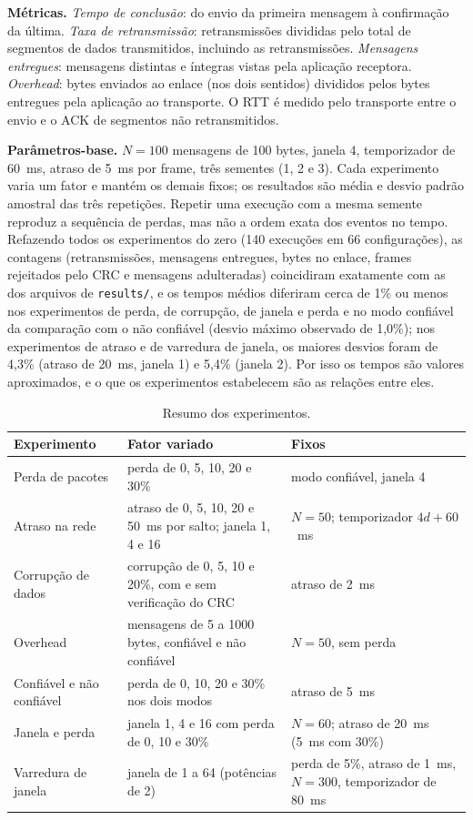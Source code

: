 \documentclass[11pt,a4paper]{article}
\begin{document}
\textbf{M\'etricas.} \emph{Tempo de conclus\~ao}: do envio da primeira mensagem \`a confirma\c{c}\~ao da \'ultima. \emph{Taxa de retransmiss\~ao}: retransmiss\~oes divididas pelo total de segmentos de dados transmitidos, incluindo as retransmiss\~oes. \emph{Mensagens entregues}: mensagens distintas e \'integras vistas pela aplica\c{c}\~ao receptora. \emph{Overhead}: bytes enviados ao enlace (nos dois sentidos) divididos pelos bytes entregues pela aplica\c{c}\~ao ao transporte. O RTT \'e medido pelo transporte entre o envio e o ACK de segmentos n\~ao retransmitidos.

\textbf{Par\^ametros-base.} $N = 100$ mensagens de 100 bytes, janela 4, temporizador de 60~ms, atraso de 5~ms por frame, tr\^es sementes (1, 2 e 3). Cada experimento varia um fator e mant\'em os demais fixos; os resultados s\~ao m\'edia e desvio padr\~ao amostral das tr\^es repeti\c{c}\~oes. Repetir uma execu\c{c}\~ao com a mesma semente reproduz a sequ\^encia de perdas, mas n\~ao a ordem exata dos eventos no tempo. Refazendo todos os experimentos do zero (140 execu\c{c}\~oes em 66 configura\c{c}\~oes), as contagens (retransmiss\~oes, mensagens entregues, bytes no enlace, frames rejeitados pelo CRC e mensagens adulteradas) coincidiram exatamente com as dos arquivos de \texttt{results/}, e os tempos m\'edios diferiram cerca de 1\% ou menos nos experimentos de perda, de corrup\c{c}\~ao, de janela e perda e no modo confi\'avel da compara\c{c}\~ao com o n\~ao confi\'avel (desvio m\'aximo observado de 1,0\%); nos experimentos de atraso e de varredura de janela, os maiores desvios foram de 4,3\% (atraso de 20~ms, janela 1) e 5,4\% (janela 2). Por isso os tempos s\~ao valores aproximados, e o que os experimentos estabelecem s\~ao as rela\c{c}\~oes entre eles.

\begin{table}[H]
\centering\small
\begin{tabular}{L{3.1cm}L{4.8cm}L{6.2cm}}
\toprule
\textbf{Experimento} & \textbf{Fator variado} & \textbf{Fixos} \\
\midrule
Perda de pacotes & perda de 0, 5, 10, 20 e 30\% & modo confi\'avel, janela 4 \\
Atraso na rede & atraso de 0, 5, 10, 20 e 50~ms por salto; janela 1, 4 e 16 & $N = 50$; temporizador $4d + 60$~ms \\
Corrup\c{c}\~ao de dados & corrup\c{c}\~ao de 0, 5, 10 e 20\%, com e sem verifica\c{c}\~ao do CRC & atraso de 2~ms \\
Overhead & mensagens de 5 a 1000 bytes, confi\'avel e n\~ao confi\'avel & $N = 50$, sem perda \\
Confi\'avel e n\~ao confi\'avel & perda de 0, 10, 20 e 30\% nos dois modos & atraso de 5~ms \\
Janela e perda & janela 1, 4 e 16 com perda de 0, 10 e 30\% & $N = 60$; atraso de 20~ms (5~ms com 30\%) \\
Varredura de janela & janela de 1 a 64 (pot\^encias de 2) & perda de 5\%, atraso de 1~ms, $N = 300$, temporizador de 80~ms \\
\bottomrule
\end{tabular}
\caption{Resumo dos experimentos.}
\end{table}
\end{document}
